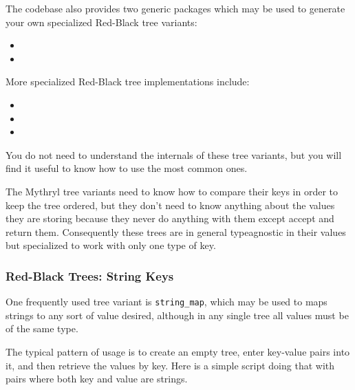 The codebase also provides two generic packages which may be 
used to generate your own specialized Red-Black tree variants:

\begin{itemize}
\item {}
\item {}
\end{itemize}

More specialized Red-Black tree implementations include: 

\begin{itemize}
\item {}
\item {}
\item {}
\end{itemize}

You do not need to understand the internals of these tree variants, but you 
will find it useful to know how to use the most common ones.

The Mythryl tree variants need to know how to compare their keys in order 
to keep the tree ordered, but they don't need to know anything about the 
values they are storing because they never do anything with them except 
accept and return them.  Consequently these trees are in general typeagnostic 
in their values but specialized to work with only one type of key.

\cutend*

\subsubsection{Red-Black Trees: String Keys}

One frequently used tree variant is {\tt string\_map}, which may be used to 
maps strings to any sort of value desired, although in any single tree all 
values must be of the same type.

The typical pattern of usage is to create an empty tree, enter key-value pairs into 
it, and then retrieve the values by key.  Here is a simple script doing that with 
pairs where both key and value are strings.

